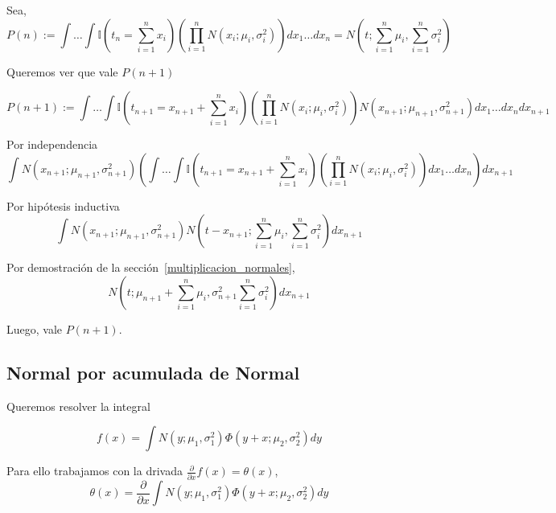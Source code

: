 \documentclass[article]{jss}
\begin{document}
\begin{appendix}
Sea,
\begin{equation}
 P(n) :=\int \dots \int \mathbb{I}(t_n= \sum_{i=1}^n x_i ) \left( \prod_{i=1}^n N(x_i;\mu_i,\sigma_i^2) \right) dx_1 \dots dx_n = N(t;\sum_{i=1}^n \mu_i,\sum_{i=1}^n \sigma_i^2 )
\end{equation}

Queremos ver que vale $P(n+1)$

\begin{equation}
 P(n+1) := \int \dots \int \mathbb{I}(t_{n+1}=  x_{n+1} + \sum_{i=1}^{n} x_i ) \left( \prod_{i=1}^{n} N(x_i;\mu_i,\sigma_i^2) \right) N(x_{n+1};\mu_{n+1},\sigma_{n+1}^2) dx_1 \dots dx_{n} dx_{n+1}
\end{equation}

Por independencia
\begin{equation}
 \int N(x_{n+1};\mu_{n+1},\sigma_{n+1}^2) \left( \int \dots \int \mathbb{I}(t_{n+1}= x_{n+1} + \sum_{i=1}^{n} x_i ) \left( \prod_{i=1}^{n} N(x_i;\mu_i,\sigma_i^2) \right)  dx_1 \dots dx_{n}\right) dx_{n+1}
\end{equation}

Por hip\'otesis inductiva
\begin{equation}
 \int N(x_{n+1};\mu_{n+1},\sigma_{n+1}^2) N(t-x_{n+1};\sum_{i=1}^n \mu_i,\sum_{i=1}^n \sigma_i^2) dx_{n+1}
\end{equation}

Por demostraci\'on de la secci\'on~\ref{multiplicacion_normales},
\begin{equation}
  N(t;\mu_{n+1}+\sum_{i=1}^{n} \mu_i,\sigma_{n+1}^2 \sum_{i=1}^n \sigma_i^2) dx_{n+1}
\end{equation}

Luego, vale $P(n+1)$.

\subsection{Normal por acumulada de Normal}

Queremos resolver la integral

\begin{equation}
 f(x) = \int N(y;\mu_1,\sigma_1^2)\Phi(y+x;\mu_2,\sigma_2^2) dy
\end{equation}

Para ello trabajamos con la drivada $\frac{\partial}{\partial x}f(x) = \theta(x)$,
\begin{equation}
 \theta(x) = \frac{\partial}{\partial x}\int N(y;\mu_1,\sigma_1^2)\Phi(y+x;\mu_2,\sigma_2^2) dy
\end{equation}


\end{appendix}
\end{document}
